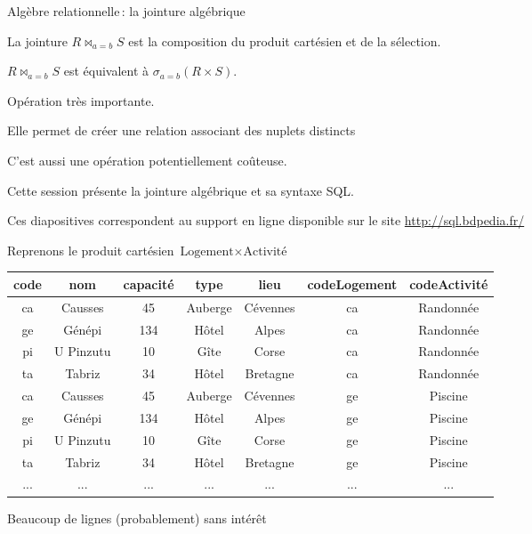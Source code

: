 
\begin{frame}[fragile]{Algèbre relationnelle\,: la jointure algébrique}

La jointure 
$R \Join_{a=b} S$ est la composition du produit cartésien et de la sélection. 

\vfill
$R \Join_{a=b} S$ est équivalent à  $\sigma_{a=b} (R \times S)$.

\vfill

Opération très importante. 
\begin{redbullet}
  \item Elle permet de créer une relation associant  des nuplets distincts
  \item C'est aussi une opération potentiellement coûteuse.
\end{redbullet}

\vfill

Cette session présente la jointure algébrique et sa syntaxe SQL.

\vfill
\begin{blocgauche}
\alert{Ces diapositives correspondent au support en ligne disponible sur
le site \url{http://sql.bdpedia.fr/}}
\end{blocgauche}

\end{frame}


\begin{frame}{Reprenons le produit cartésien $\text{Logement} \times \text{Activité}$ }

\begin{center}
\begin{tabular}{c|c|c|c|c|c|c}
\textbf{code} & \textbf{nom} & \textbf{capacité} & \textbf{type} & \textbf{lieu} & \textbf{codeLogement} & \textbf{codeActivité}\\ \hline 
ca & Causses & 45 & Auberge & Cévennes & ca & Randonnée\\ \hline 
ge & Génépi & 134 & Hôtel & Alpes & ca & Randonnée\\ \hline 
pi & U Pinzutu & 10 & Gîte & Corse & ca & Randonnée\\ \hline 
ta & Tabriz & 34 & Hôtel & Bretagne & ca & Randonnée\\ \hline 
ca & Causses & 45 & Auberge & Cévennes & ge & Piscine\\ \hline 
ge & Génépi & 134 & Hôtel & Alpes & ge & Piscine\\ \hline 
pi & U Pinzutu & 10 & Gîte & Corse & ge & Piscine\\ \hline 
ta & Tabriz & 34 & Hôtel & Bretagne & ge & Piscine\\ \hline 
... & ... & ... & ... & ... & ... & ...\\ \hline 
\end{tabular}
\end{center}


\vfill

\begin{blocgauche}
Beaucoup de lignes (probablement) sans  intérêt 
\end{blocgauche}
\end{frame}

